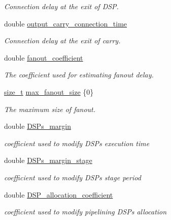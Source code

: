 \begin{DoxyCompactItemize}
\begin{DoxyCompactList}\small\item\em Connection delay at the exit of D\+SP. \end{DoxyCompactList}\item 
double \hyperlink{classAllocationInformation_ac86ac888cc1e02afa1bdf03a53d49f75}{output\+\_\+carry\+\_\+connection\+\_\+time}
\begin{DoxyCompactList}\small\item\em Connection delay at the exit of carry. \end{DoxyCompactList}\item 
double \hyperlink{classAllocationInformation_ae286ec58583e2e5bdc93f918b604594f}{fanout\+\_\+coefficient}
\begin{DoxyCompactList}\small\item\em The coefficient used for estimating fanout delay. \end{DoxyCompactList}\item 
\hyperlink{tutorial__fpt__2017_2intro_2sixth_2test_8c_a7c94ea6f8948649f8d181ae55911eeaf}{size\+\_\+t} \hyperlink{classAllocationInformation_a85587c191fdf7b58d4f7c6df90aa63d1}{max\+\_\+fanout\+\_\+size} \{0\}
\begin{DoxyCompactList}\small\item\em The maximum size of fanout. \end{DoxyCompactList}\item 
double \hyperlink{classAllocationInformation_a024956e0654caf39c60585eb19cd35a3}{D\+S\+Ps\+\_\+margin}
\begin{DoxyCompactList}\small\item\em coefficient used to modify D\+S\+Ps execution time \end{DoxyCompactList}\item 
double \hyperlink{classAllocationInformation_aae9f2769a604bfa84c9408846ddcad08}{D\+S\+Ps\+\_\+margin\+\_\+stage}
\begin{DoxyCompactList}\small\item\em coefficient used to modify D\+S\+Ps stage period \end{DoxyCompactList}\item 
double \hyperlink{classAllocationInformation_aa1e75c4aa5851a5e9efb33a3226558e4}{D\+S\+P\+\_\+allocation\+\_\+coefficient}
\begin{DoxyCompactList}\small\item\em coefficient used to modify pipelining D\+S\+Ps allocation \end{DoxyCompactList}\item 

\end{DoxyCompactItemize}
